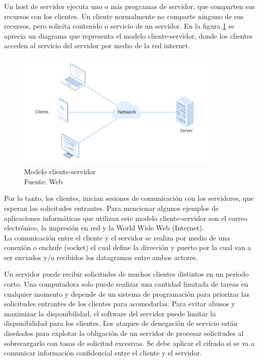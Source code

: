 Un host de servidor ejecuta uno o más programas de servidor, que comparten sus recursos con los clientes. Un cliente normalmente no comparte ninguno de sus recursos, pero solicita contenido o servicio de un servidor. En la figura \ref{fig:client_server} se aprecia un diagrama que representa el modelo cliente-servidor, donde los clientes acceden al servicio del servidor por medio de la red internet.\\

\begin{figure}[H]
    \begin{center}
        \includegraphics[width=10cm]{img/capitulo_2/client-server.jpeg}
    \end{center}
    \caption{Modelo cliente-servidor\\Fuente: Web}
    \label{fig:client_server}
\end{figure}

Por lo tanto, los clientes, inician sesiones de comunicación con los servidores, que esperan las solicitudes entrantes. Para mencionar algunos ejemplos de aplicaciones informáticas que utilizan este modelo cliente-servidor son el correo electrónico, la impresión en red y la World Wide Web (Internet).\\

La comunicación entre el cliente y el servidor se realiza por medio de una conexión o enchufe (socket) el cual define la dirección y puerto por la cual van a ser enviados y/o recibidos los datagramas entre ambos actores.


Un servidor puede recibir solicitudes de muchos clientes distintos en un período corto. Una computadora solo puede realizar una cantidad limitada de tareas en cualquier momento y depende de un sistema de programación para priorizar las solicitudes entrantes de los clientes para acomodarlas. Para evitar abusos y maximizar la disponibilidad, el software del servidor puede limitar la disponibilidad para los clientes. Los ataques de denegación de servicio están diseñados para explotar la obligación de un servidor de procesar solicitudes al sobrecargarlo con tasas de solicitud excesivas. Se debe aplicar el cifrado si se va a comunicar información confidencial entre el cliente y el servidor.

